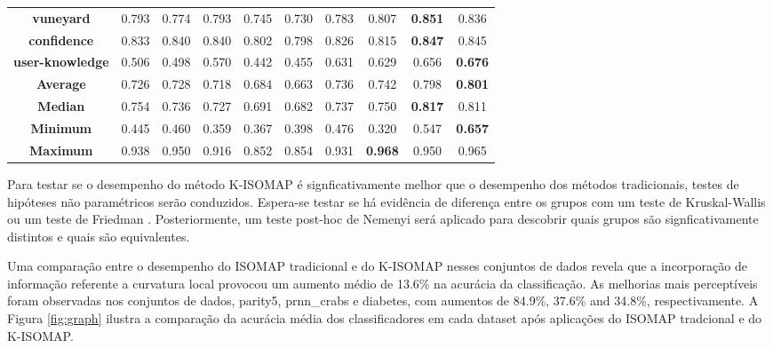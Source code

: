 \documentclass[a4paper,12pt]{article}
\begin{document}
\begin{table*}[htb]
\begin{tabular}{cccccccccc}
\textbf{vuneyard}         & 0.793        & 0.774          & 0.793        & 0.745        & 0.730              & 0.783          & 0.807          & \textbf{0.851}   & 0.836          \\
\textbf{confidence}       & 0.833        & 0.840          & 0.840        & 0.802        & 0.798              & 0.826          & 0.815          & \textbf{0.847}   & 0.845          \\
\textbf{user-knowledge}       & 0.506        & 0.498          & 0.570        & 0.442        & 0.455              & 0.631          & 0.629          & 0.656            & \textbf{0.676} \\
\midrule
\textbf{Average}          & 0.726        & 0.728          & 0.718        & 0.684        & 0.663              & 0.736          & 0.742          & 0.798   & \textbf{0.801} \\
\textbf{Median}           & 0.754        & 0.736          & 0.727        & 0.691        & 0.682              & 0.737          & 0.750          & \textbf{0.817}            & 0.811 \\
\textbf{Minimum}          & 0.445        & 0.460          & 0.359        & 0.367        & 0.398              & 0.476          & 0.320          & 0.547            & \textbf{0.657} \\
\textbf{Maximum}          & 0.938        & 0.950          & 0.916        & 0.852        & 0.854              & 0.931          & \textbf{0.968} & 0.950            & 0.965 \\
\bottomrule      
  \end{tabular}
  \label{tab:acc}
\end{table*}

Para testar se o desempenho do método K-ISOMAP é signficativamente melhor que o desempenho dos métodos tradicionais, testes de hipóteses não paramétricos serão conduzidos. Espera-se testar se há evidência de diferença entre os grupos com um teste de Kruskal-Wallis \cite{KruskalWallis} ou um teste de Friedman \cite{Friedman}. Posteriormente, um teste post-hoc de Nemenyi \cite{Nemenyi} será aplicado para descobrir quais grupos são signficativamente distintos e quais são equivalentes.

Uma comparação entre o desempenho do ISOMAP tradicional e do K-ISOMAP nesses conjuntos de dados revela que a incorporação de informação referente a curvatura local provocou um aumento médio de 13.6\% na acurácia da classificação. As melhorias mais perceptíveis foram observadas nos conjuntos de dados, parity5, prnn\_crabs e diabetes, com aumentos de 84.9\%, 37.6\% and 34.8\%, respectivamente. A Figura \ref{fig:graph} ilustra a comparação da acurácia média dos classificadores em cada dataset após aplicações do ISOMAP tradcional e do K-ISOMAP.
\end{document}
